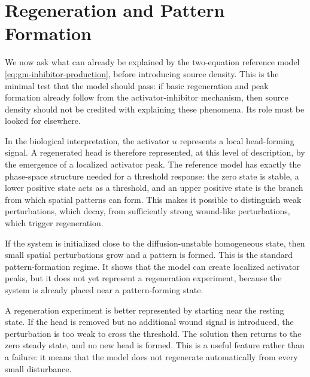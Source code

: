 \section{Regeneration and Pattern Formation}
\label{sec:regeneration-pattern-formation}


We now ask what can already be explained by the two-equation reference model
\eqref{eq:gm-inhibitor-production}, before introducing source density. This is
the minimal test that the model should pass: if basic regeneration and peak
formation already follow from the activator-inhibitor mechanism, then source
density should not be credited with explaining these phenomena. Its role must be
looked for elsewhere.

In the biological interpretation, the activator \(u\) represents a local
head-forming signal. A regenerated head is therefore represented, at this level
of description, by the emergence of a localized activator peak. The reference
model has exactly the phase-space structure needed for a threshold response: the
zero state is stable, a lower positive state acts as a threshold, and an upper
positive state is the branch from which spatial patterns can form. This makes it
possible to distinguish weak perturbations, which decay, from sufficiently
strong wound-like perturbations, which trigger regeneration.

If the system is initialized close to the diffusion-unstable homogeneous state,
then small spatial perturbations grow and a pattern is formed. This is the
standard pattern-formation regime. It shows that the model can create localized
activator peaks, but it does not yet represent a regeneration experiment,
because the system is already placed near a pattern-forming state.

A regeneration experiment is better represented by starting near the resting
state. If the head is removed but no additional wound signal is introduced, the
perturbation is too weak to cross the threshold. The solution then returns to the
zero steady state, and no new head is formed. This is a useful feature rather
than a failure: it means that the model does not regenerate automatically from
every small disturbance.

